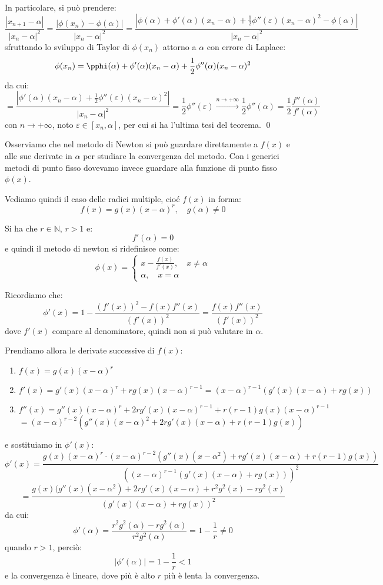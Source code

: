 \documentclass[a4paper,11pt]{article}
\begin{document}
In particolare, si può prendere:
$$
\frac{|x_{n + 1} - \alpha|}{|x_n - \alpha|^2} = \frac{|\phi(x_n) - \phi(\alpha)|}{|x_n - \alpha|^2} 
= \frac{ | \phi(\alpha) + \phi'(\alpha) (x_n - \alpha) + \frac{1}{2} \phi''(\varepsilon) (x_n - \alpha)^2 - \phi(\alpha) | }{ |x_n - \alpha|^2 }
$$
sfruttando lo sviluppo di Taylor di $\phi(x_n)$ attorno a $\alpha$ con errore di Laplace:
$$
\phi(x_n) = \pphi(\alpha) + \phi'(\alpha) (x_n - \alpha) + \frac{1}{2} \phi''(\alpha) (x_n - \alpha)^2
$$
da cui:
$$
= \frac{ | \phi'(\alpha) (x_n - \alpha) + \frac{1}{2} \phi''(\varepsilon) (x_n - \alpha)^2 | }{ |x_n - \alpha|^2 }
= \frac{1}{2} \phi''(\varepsilon) \xrightarrow{n \rightarrow +\infty} \frac{1}{2} \phi''(\alpha) = \frac{1}{2} \frac{f''(\alpha)}{f'(\alpha)}
$$
con $n \rightarrow +\infty$, noto $\varepsilon \in [x_n, \alpha]$, per cui si ha l'ultima tesi del teorema. \qed

Osserviamo che nel metodo di Newton si può guardare direttamente a $f(x)$ e alle sue derivate in $\alpha$ per studiare la convergenza del metodo.
Con i generici metodi di punto fisso dovevamo invece guardare alla funzione di punto fisso $\phi(x)$.

Vediamo quindi il caso delle radici multiple, cioé $f(x)$ in forma:
$$
f(x) = g(x) (x - \alpha)^r, \quad g(\alpha) \neq 0
$$

Si ha che $r \in \mathbb{N}$, $r > 1$ e:
$$
f'(\alpha) = 0
$$
e quindi il metodo di newton si ridefinisce come:
$$
\phi(x) =
	\begin{cases}
		x - \frac{f(x)}{f'(x)}, \quad x \neq \alpha \\ 
		\alpha,  \quad x = \alpha
	\end{cases}
$$

Ricordiamo che:
$$
\phi'(x) = 1 - \frac{(f'(x))^2 - f(x) f''(x)}{(f'(x))^2} = \frac{f(x) f''(x)}{(f'(x))^2}
$$
dove $f'(x)$ compare al denominatore, quindi non si può valutare in $\alpha$.

Prendiamo allora le derivate successive di $f(x)$:
\begin{enumerate}
	\item 
$
f(x) = g(x) (x - \alpha)^r
$
	\item 
$
f'(x) = g'(x) (x - \alpha)^r + r g(x) (x - \alpha)^{r - 1} = (x - \alpha)^{r - 1} ( g'(x)(x - \alpha) + r g(x) )
$
	\item
$
f''(x) = g''(x) (x - \alpha)^r + 2 r g'(x)(x - \alpha)^{r - 1} + r (r - 1) g(x) (x - \alpha)^{r - 1}
$ \\ 
$$
= (x - \alpha)^{r - 2} ( g''(x) (x - \alpha)^2 + 2 r g'(x) (x - \alpha) + r (r - 1) g(x) )
$$
\end{enumerate}
e sostituiamo in $\phi'(x)$:
$$
\phi'(x) = \frac{ g(x) (x - \alpha)^r \cdot (x - \alpha)^{r - 2} ( g''(x) (x - \alpha^2) + r g'(x) (x - \alpha) + r (r - 1) g(x) ) }{ ( (x - \alpha)^{r - 1} (g'(x) (x - \alpha) + r g(x) ) )^2 }
$$
$$
= \frac{g(x) (g''(x) (x - \alpha^2) + 2 r g'(x) (x - \alpha) + r^2 g^2(x) - r g^2(x) }{(g'(x)(x - \alpha) + r g(x))^2}
$$
da cui:
$$
\phi'(\alpha) = \frac{r^2 g^2(\alpha) - r g^2(\alpha)}{r^2 g^2(\alpha)} = 1 - \frac{1}{r} \neq 0
$$
quando $r > 1$, perciò:
$$
|\phi'(\alpha)| = 1 - \frac{1}{r} < 1
$$
e la convergenza è lineare, dove più è alto $r$ più è lenta la convergenza.
\end{document}
